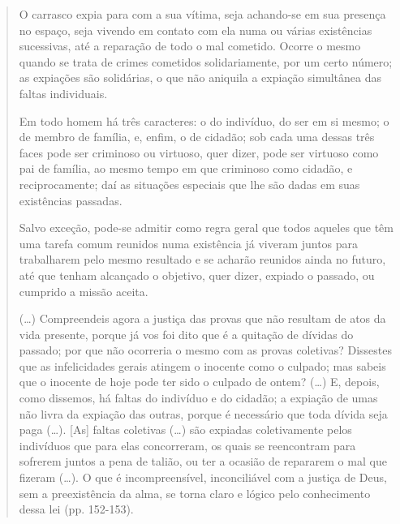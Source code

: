 \begin{quote}
O carrasco expia para com a sua vítima, seja achando-se em sua presença
no espaço, seja vivendo em contato com ela numa ou várias existências
sucessivas, até a reparação de todo o mal cometido. Ocorre o mesmo
quando se trata de crimes cometidos solidariamente, por um certo número;
as expiações são solidárias, o que não aniquila a expiação simultânea
das faltas individuais.

Em todo homem há três caracteres: o do indivíduo, do ser em si mesmo; o
de membro de família, e, enfim, o de cidadão; sob cada uma dessas três
faces pode ser criminoso ou virtuoso, quer dizer, pode ser virtuoso como
pai de família, ao mesmo tempo em que criminoso como cidadão, e
reciprocamente; daí as situações especiais que lhe são dadas em suas
existências passadas.

Salvo exceção, pode-se admitir como regra geral que todos aqueles que
têm uma tarefa comum reunidos numa existência já viveram juntos para
trabalharem pelo mesmo resultado e se acharão reunidos ainda no futuro,
até que tenham alcançado o objetivo, quer dizer, expiado o passado, ou
cumprido a missão aceita.

(\ldots{}) Compreendeis agora a justiça das provas que não resultam de
atos da vida presente, porque já vos foi dito que é a quitação de
dívidas do passado; por que não ocorreria o mesmo com as provas
coletivas? Dissestes que as infelicidades gerais atingem o inocente como
o culpado; mas sabeis que o inocente de hoje pode ter sido o culpado de
ontem? (\ldots{}) E, depois, como dissemos, há faltas do indivíduo e do
cidadão; a expiação de umas não livra da expiação das outras, porque é
necessário que toda dívida seja paga (\ldots{}). {[}As{]} faltas
coletivas (\ldots{}) são expiadas coletivamente pelos indivíduos que
para elas concorreram, os quais se reencontram para sofrerem juntos a
pena de talião, ou ter a ocasião de repararem o mal que fizeram
(\ldots{}). O que é incompreensível, inconciliável com a justiça de
Deus, sem a preexistência da alma, se torna claro e lógico pelo
conhecimento dessa lei (pp. 152-153).
\end{quote}

